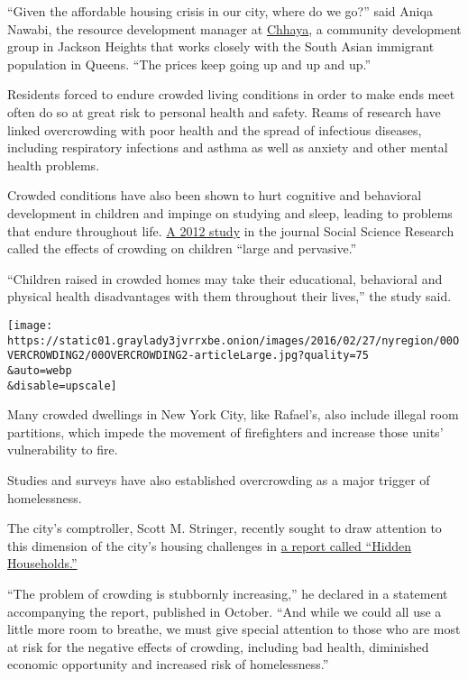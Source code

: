 ``Given the affordable housing crisis in our city, where do we go?''
said Aniqa Nawabi, the resource development manager at
\href{http://chhayacdc.org/}{Chhaya}, a community development group in
Jackson Heights that works closely with the South Asian immigrant
population in Queens. ``The prices keep going up and up and up.''

Residents forced to endure crowded living conditions in order to make
ends meet often do so at great risk to personal health and safety. Reams
of research have linked overcrowding with poor health and the spread of
infectious diseases, including respiratory infections and asthma as well
as anxiety and other mental health problems.

Crowded conditions have also been shown to hurt cognitive and behavioral
development in children and impinge on studying and sleep, leading to
problems that endure throughout life.
\href{http://www.ncbi.nlm.nih.gov/pmc/articles/PMC3805127/}{A 2012
study} in the journal Social Science Research called the effects of
crowding on children ``large and pervasive.''

``Children raised in crowded homes may take their educational,
behavioral and physical health disadvantages with them throughout their
lives,'' the study said.

\texttt{[image: https://static01.graylady3jvrrxbe.onion/images/2016/02/27/nyregion/00OVERCROWDING2/00OVERCROWDING2-articleLarge.jpg?quality=75\\\&auto=webp\\\&disable=upscale]}

Many crowded dwellings in New York City, like Rafael's, also include
illegal room partitions, which impede the movement of firefighters and
increase those units' vulnerability to fire.

Studies and surveys have also established overcrowding as a major
trigger of homelessness.

The city's comptroller, Scott M. Stringer, recently sought to draw
attention to this dimension of the city's housing challenges in
\href{http://comptroller.nyc.gov/wp-content/uploads/documents/Hidden_Households.pdf}{a
report called ``Hidden Households.''}

``The problem of crowding is stubbornly increasing,'' he declared in a
statement accompanying the report, published in October. ``And while we
could all use a little more room to breathe, we must give special
attention to those who are most at risk for the negative effects of
crowding, including bad health, diminished economic opportunity and
increased risk of homelessness.''


